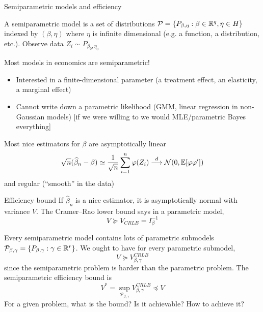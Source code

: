 \documentclass[10pt,aspectratio=169,handout]{beamer}
\theoremstyle{definition}
\begin{document}
\begin{frame}{Semiparametric models and efficiency}

A semiparametric model is a set of distributions $\mathcal P = \{P_
{\beta,\eta} : \beta\in \mathbb{R}^q, \eta\in H\}$ indexed by $(\beta,\eta)$ where
$\eta$ is infinite dimensional (e.g. a function, a distribution, etc.).
Observe data $Z_i \sim P_{\beta_0, \eta_0}$

Most models in economics are semiparametric!
\begin{itemize}
  \item[\checkmark] Interested in a finite-dimensional parameter (a
  treatment effect, an elasticity, a marginal effect)
  \item[\checkmark] Cannot write down a parametric likelihood (GMM, linear
  regression in non-Gaussian models) [if we were willing to we would
  MLE/parametric Bayes everything]
\end{itemize}
  
Most \alert{nice} estimators for $\beta$ are \alert{asymptotically linear}
\[
\sqrt{n} (\widehat \beta_n - \beta) \simeq \frac{1}{\sqrt{n}}\sum_{i=1}^n
\varphi(Z_i) \overset{d}{\longrightarrow} \mathcal{N}(0, \mathbb{E}[\varphi \varphi'])
\]
and \alert{regular} (``smooth'' in the data)
\end{frame}

\begin{frame}{Efficiency bound}
  If $\hat \beta_n$ is a nice estimator, it is asymptotically normal with
  variance $V$. The \alert{Cramer--Rao lower bound} says in a 
  \alert{parametric}
  model, \[
  V \succeq V_{CRLB} = I_\beta^{-1}
  \]
  
  Every semiparametric model contains lots of \alert{parametric submodels}
  $\mathcal P_{\beta,\gamma} = \{P_{\beta,\gamma}: \gamma \in \mathbb{R}^r\}$. We
  ought to have for every parametric submodel, \[
  V \succeq V_{\beta,\gamma}^{CRLB}
  \]
  since the semiparametric problem is harder than the parametric problem.  The \alert{semiparametric efficiency bound} is \[
  V^* = \sup_{\mathcal P_{\beta,\gamma}} V_{\beta,\gamma}^{CRLB} \preceq V
  \]
  For a given problem, what is the bound? Is it achievable? How to achieve
  it?
\end{frame}
\end{document}
